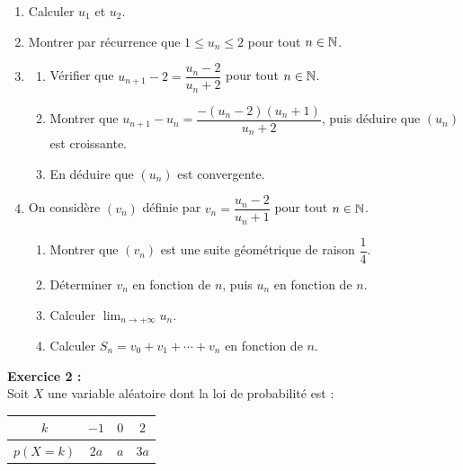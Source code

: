 \begin{enumerate}[leftmargin=1.5em, label=\textbf{\arabic*)}, itemsep=2pt, topsep=4pt]
  \item Calculer $u_1$ et $u_2$.
  \item Montrer par r\'{e}currence que $1 \leq u_n \leq 2$ pour tout $n \in \mathbb{N}$.
  \item
    \begin{enumerate}[label=\textbf{\alph*)}, itemsep=1pt, topsep=1pt]
      \item V\'{e}rifier que $u_{n+1} - 2 = \dfrac{u_n - 2}{u_n + 2}$ pour tout $n \in \mathbb{N}$.
      \item Montrer que $u_{n+1} - u_n = \dfrac{-(u_n - 2)(u_n + 1)}{u_n + 2}$,
            puis d\'{e}duire que $(u_n)$ est croissante.
      \item En d\'{e}duire que $(u_n)$ est convergente.
    \end{enumerate}
  \item On consid\`{e}re $(v_n)$ d\'{e}finie par $v_n = \dfrac{u_n - 2}{u_n + 1}$ pour tout $n \in \mathbb{N}$.
    \begin{enumerate}[label=\textbf{\alph*)}, itemsep=1pt, topsep=1pt]
      \item Montrer que $(v_n)$ est une suite g\'{e}om\'{e}trique de raison $\dfrac{1}{4}$.
      \item D\'{e}terminer $v_n$ en fonction de $n$, puis $u_n$ en fonction de $n$.
      \item Calculer $\displaystyle\lim_{n \to +\infty} u_n$.
      \item Calculer $S_n = v_0 + v_1 + \cdots + v_n$ en fonction de $n$.
    \end{enumerate}
\end{enumerate}

\medskip

\noindent\textbf{Exercice 2 :}\\
Soit $X$ une variable al\'{e}atoire dont la loi de probabilit\'{e} est :

\medskip
\begin{center}
\renewcommand{\arraystretch}{1.4}
\begin{tabular}{|c|c|c|c|}
  \hline
  \rowcolor{navylight}
  \textbf{\color{navy}$k$} & $-1$ & $0$ & $2$ \\
  \hline
  \textbf{\color{navy}$p(X=k)$} & $2a$ & $a$ & $3a$ \\
  \hline
\end{tabular}
\end{center}
\medskip

